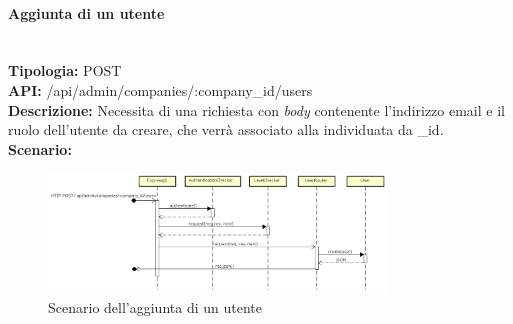 \newpage
\paragraph{Aggiunta di un utente}\mbox{}\\
\textbf{Tipologia:} POST \\
\textbf{API:} /api/admin/companies/:company\_id/users \\
\textbf{Descrizione:} Necessita di una richiesta con \textit{body} contenente l'indirizzo email e il ruolo dell'utente da creare, che verrà associato alla  individuata da \_id. \\
\textbf{Scenario:} 
\begin{figure}[H]
\centering
\includegraphics[width=0.8\textwidth]{res/sections/backend/sequence/(POST)userSA.png}
\caption{Scenario dell'aggiunta di un utente}
\end{figure}
